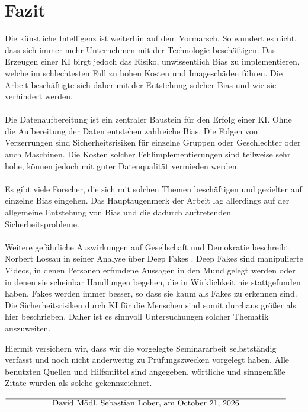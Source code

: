 \documentclass[12pt,oneside,a4paper,parskip]{scrbook}
\def\BaAuthor{David Mödl, Sebastian Lober}
\def\ShowBaAuthor{\BaAuthor}
\def\ShowBaAuthor{David Mödl, Sebastian Lober}
\begin{document}
\chapter{Fazit}
Die künstliche Intelligenz ist weiterhin auf dem Vormarsch. So wundert es nicht, dass sich immer mehr Unternehmen mit der Technologie beschäftigen. Das Erzeugen einer KI birgt jedoch das Risiko, unwissentlich Bias zu implementieren, welche im schlechtesten Fall zu hohen Kosten und Imageschäden führen. Die Arbeit beschäftigte sich daher mit der Entstehung solcher Bias und wie sie verhindert werden.
\\\\
Die Datenaufbereitung ist ein zentraler Baustein für den Erfolg einer KI. Ohne die Aufbereitung der Daten entstehen zahlreiche Bias. 
Die Folgen von Verzerrungen sind Sicherheitsrisiken für einzelne Gruppen oder Geschlechter oder auch Maschinen. Die Kosten solcher Fehlimplementierungen sind teilweise sehr hohe, können jedoch mit guter Datenqualität vermieden werden.
\\\\
Es gibt viele Forscher, die sich mit solchen Themen beschäftigen und gezielter auf einzelne Bias eingehen. Das Hauptaugenmerk der Arbeit lag allerdings auf der allgemeine Entstehung von Bias und die dadurch auftretenden Sicherheitsprobleme.
\\\\
Weitere gefährliche Auswirkungen auf Gesellschaft und Demokratie beschreibt Norbert Lossau in seiner Analyse über Deep Fakes \cite{deepFake}. Deep Fakes sind manipulierte Videos, in denen Personen erfundene Aussagen in den Mund gelegt werden oder in denen sie scheinbar Handlungen begehen, die in Wirklichkeit nie stattgefunden haben. Fakes werden immer besser, so dass sie kaum als Fakes zu erkennen sind. Die Sicherheitsrisiken durch KI für die Menschen sind somit durchaus größer als hier beschrieben. Daher ist es sinnvoll Untersuchungen solcher Thematik auszuweiten.

\backmatter


\cleardoublepage
{}
{}
\printbibliography


Hiermit versichern wir, dass wir die vorgelegte Seminararbeit selbstständig verfasst und noch nicht anderweitig zu Prüfungszwecken vorgelegt haben. Alle benutzten Quellen und Hilfsmittel sind angegeben, wörtliche und sinngemäße Zitate wurden als solche gekennzeichnet.

\vspace{20pt}
\begin{flushright}
	$\overline{~~~~~~~~~~~~~~~~~\mbox{\ShowBaAuthor, am \today}~~~~~~~~~~~~~~~~~}$
\end{flushright}
\end{document}
